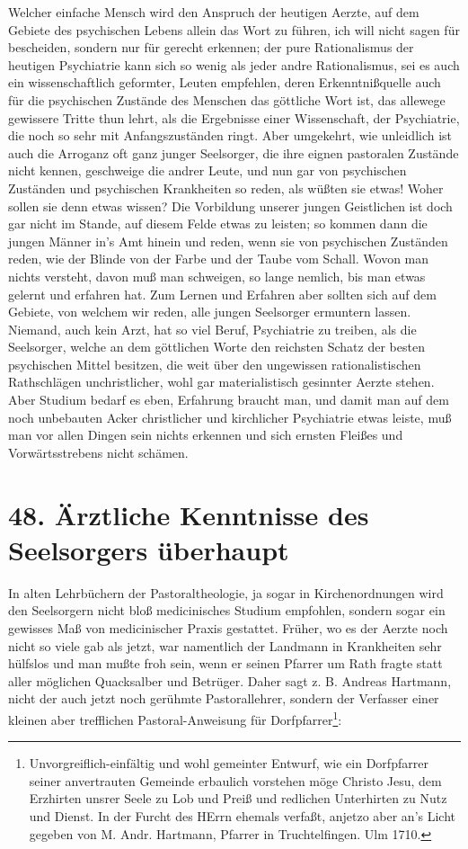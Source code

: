 Welcher einfache Mensch wird den Anspruch der heutigen Aerzte, auf dem Gebiete des psychischen Lebens allein das Wort zu führen, ich will nicht sagen für bescheiden, sondern nur für gerecht erkennen; der pure Rationalismus der heutigen Psychiatrie kann sich so wenig als jeder andre Rationalismus, sei es auch ein wissenschaftlich geformter, Leuten empfehlen,
deren Erkenntnißquelle auch für die psychischen Zustände des Menschen das göttliche Wort ist, das allewege gewissere Tritte thun lehrt, als die Ergebnisse einer Wissenschaft, der Psychiatrie, die noch so sehr mit Anfangszuständen ringt. Aber umgekehrt, wie unleidlich ist auch die Arroganz oft ganz junger Seelsorger, die ihre eignen pastoralen Zustände nicht kennen, geschweige die andrer Leute, und nun gar von psychischen Zuständen und psychischen Krankheiten so reden, als wüßten sie etwas! Woher sollen sie denn etwas wissen? Die Vorbildung unserer jungen Geistlichen ist doch gar nicht im Stande, auf diesem Felde etwas zu leisten; so kommen dann die jungen Männer in’s Amt hinein und reden, wenn sie von psychischen Zuständen reden, wie der Blinde von der Farbe und der Taube vom Schall. Wovon man nichts versteht, davon muß man schweigen, so lange nemlich, bis man etwas gelernt und erfahren hat. Zum Lernen und Erfahren aber sollten sich auf dem Gebiete, von welchem wir reden, alle jungen Seelsorger ermuntern lassen. Niemand, auch kein Arzt, hat so viel Beruf, Psychiatrie zu treiben, als die Seelsorger, welche an dem göttlichen Worte den reichsten Schatz der besten psychischen Mittel besitzen, die weit über den ungewissen rationalistischen Rathschlägen unchristlicher, wohl gar materialistisch gesinnter Aerzte stehen. Aber Studium bedarf es eben, Erfahrung braucht man, und damit man auf dem noch unbebauten Acker christlicher und kirchlicher Psychiatrie etwas leiste, muß man vor allen Dingen sein nichts erkennen und sich ernsten Fleißes und Vorwärtsstrebens nicht schämen.

\section[48. Ärztliche Kenntnisse des Seelsorgers]{48. Ärztliche Kenntnisse des Seelsorgers überhaupt}

In alten Lehrbüchern der Pastoraltheologie, ja sogar in Kirchenordnungen wird den Seelsorgern nicht bloß medicinisches Studium empfohlen, sondern sogar ein gewisses Maß von medicinischer Praxis gestattet. Früher, wo es der Aerzte noch nicht so viele gab als jetzt, war namentlich der Landmann in Krankheiten sehr hülfslos und man mußte froh sein, wenn er seinen Pfarrer um Rath fragte statt aller möglichen Quacksalber und Betrüger. Daher sagt z. B. Andreas Hartmann, nicht der auch jetzt noch gerühmte Pastorallehrer, sondern der Verfasser einer kleinen aber trefflichen Pastoral-Anweisung für Dorfpfarrer\footnote{Unvorgreiflich-einfältig und wohl gemeinter Entwurf, wie ein Dorfpfarrer seiner anvertrauten Gemeinde erbaulich vorstehen möge Christo Jesu, dem Erzhirten unsrer Seele zu Lob und Preiß und redlichen Unterhirten zu Nutz und Dienst. In der Furcht des HErrn ehemals verfaßt, anjetzo aber an’s Licht gegeben von M. Andr. Hartmann, Pfarrer in Truchtelfingen. Ulm 1710.}:

